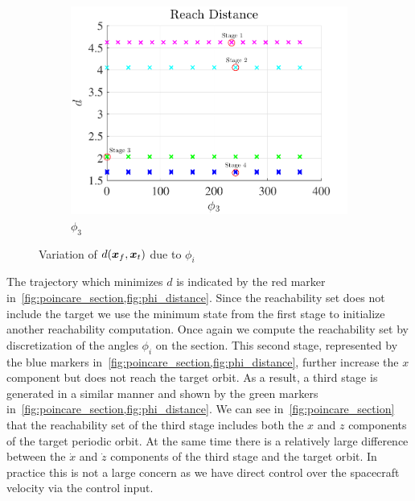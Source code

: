 \documentclass[]{aiaa-tc}%
\begin{document}
\begin{figure}[htbp]
\begin{subfigure}[htbp]{0.3\textwidth}
        \includegraphics[width=\textwidth]{figures/phi3.pdf} 
        \caption{\( \phi_3 \)} \label{fig:phi3} 
    \end{subfigure} 
    \caption{Variation of \(d(\bm{x}_f,\bm{x}_t)\) due to \( \phi_i\)}
    \label{fig:phi_distance} 
\end{figure}

The trajectory which minimizes \( d \) is indicated by the red marker in~\cref{fig:poincare_section,fig:phi_distance}.
Since the reachability set does not include the target we use the minimum state from the first stage to initialize another reachability computation.
Once again we compute the reachability set by discretization of the angles \( \phi_i \) on the \Poincare section.
This second stage, represented by the blue markers in~\cref{fig:poincare_section,fig:phi_distance}, further increase the \( x \) component but does not reach the target orbit.
As a result, a third stage is generated in a similar manner and shown by the green markers in~\cref{fig:poincare_section,fig:phi_distance}.
We can see in~\cref{fig:poincare_section} that the reachability set of the third stage includes both the \( x \) and \( z\) components of the target periodic orbit.
At the same time there is a relatively large difference between the \( \dot{x} \) and \( \dot{z} \) components of the third stage and the target orbit.
In practice this is not a large concern as we have direct control over the spacecraft velocity via the control input.
\end{document}
